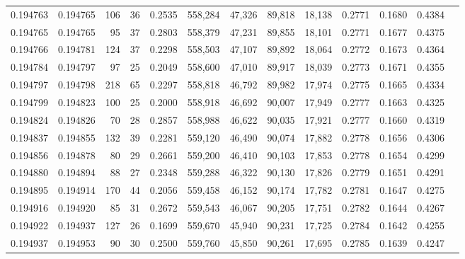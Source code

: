 \begin{tabular}{rrrrrrrrrrrrr}
0.194763 & 0.194765 &   106 &  36 &                                     0.2535 & 558,284 &  47,326 &  89,818 &  18,138 & 0.2771 & 0.1680 & 0.4384 \\
0.194765 & 0.194765 &    95 &  37 &                                     0.2803 & 558,379 &  47,231 &  89,855 &  18,101 & 0.2771 & 0.1677 & 0.4375 \\
0.194766 & 0.194781 &   124 &  37 &                                     0.2298 & 558,503 &  47,107 &  89,892 &  18,064 & 0.2772 & 0.1673 & 0.4364 \\
0.194784 & 0.194797 &    97 &  25 &                                     0.2049 & 558,600 &  47,010 &  89,917 &  18,039 & 0.2773 & 0.1671 & 0.4355 \\
0.194797 & 0.194798 &   218 &  65 &                                     0.2297 & 558,818 &  46,792 &  89,982 &  17,974 & 0.2775 & 0.1665 & 0.4334 \\
0.194799 & 0.194823 &   100 &  25 &                                     0.2000 & 558,918 &  46,692 &  90,007 &  17,949 & 0.2777 & 0.1663 & 0.4325 \\
0.194824 & 0.194826 &    70 &  28 &                                     0.2857 & 558,988 &  46,622 &  90,035 &  17,921 & 0.2777 & 0.1660 & 0.4319 \\
0.194837 & 0.194855 &   132 &  39 &                                     0.2281 & 559,120 &  46,490 &  90,074 &  17,882 & 0.2778 & 0.1656 & 0.4306 \\
0.194856 & 0.194878 &    80 &  29 &                                     0.2661 & 559,200 &  46,410 &  90,103 &  17,853 & 0.2778 & 0.1654 & 0.4299 \\
0.194880 & 0.194894 &    88 &  27 &                                     0.2348 & 559,288 &  46,322 &  90,130 &  17,826 & 0.2779 & 0.1651 & 0.4291 \\
0.194895 & 0.194914 &   170 &  44 &                                     0.2056 & 559,458 &  46,152 &  90,174 &  17,782 & 0.2781 & 0.1647 & 0.4275 \\
0.194916 & 0.194920 &    85 &  31 &                                     0.2672 & 559,543 &  46,067 &  90,205 &  17,751 & 0.2782 & 0.1644 & 0.4267 \\
0.194922 & 0.194937 &   127 &  26 &                                     0.1699 & 559,670 &  45,940 &  90,231 &  17,725 & 0.2784 & 0.1642 & 0.4255 \\
0.194937 & 0.194953 &    90 &  30 &                                     0.2500 & 559,760 &  45,850 &  90,261 &  17,695 & 0.2785 & 0.1639 & 0.4247 \\

\end{tabular}

